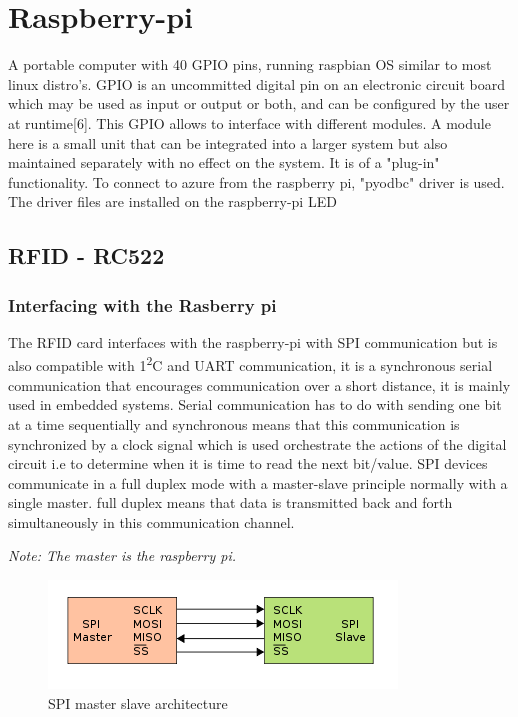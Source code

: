 
\section{Raspberry-pi}
A portable computer with 40 GPIO pins, running raspbian OS similar to most linux distro's. 
GPIO is an uncommitted digital pin on an electronic circuit board which may be used as input or output or both, and can be configured by the user at runtime[6]. This GPIO allows to interface with different modules. A module here is a small unit that can be integrated into a larger system but also maintained separately with no effect on the system. It is of a "plug-in" functionality.
To connect to azure from the raspberry pi, "pyodbc" driver is used. The driver files are installed on the raspberry-pi
LED  


\subsection{RFID - RC522}
\subsubsection{Interfacing with the Rasberry pi}
The RFID card interfaces with the raspberry-pi with SPI communication but is also compatible with 1\textsuperscript{2}C and UART communication, it is a synchronous serial communication that encourages communication over a short distance, it is mainly used in embedded systems. Serial communication has to do with sending one bit at a time sequentially and synchronous means that this communication is synchronized by a clock signal which is used orchestrate the actions of the digital circuit i.e to determine when it is time to read the next bit/value. SPI devices communicate in a full duplex mode with a master-slave principle normally with a single master. full duplex means that data is transmitted back and forth simultaneously in this communication channel.

\textit{Note: The master is the raspberry pi.}
\vspace{1cm}
\begin{figure}[h]
  \includegraphics{Background/images/350px-SPI_single_slave.svg.png.png}
  \caption{SPI master slave architecture}
\end{figure}


